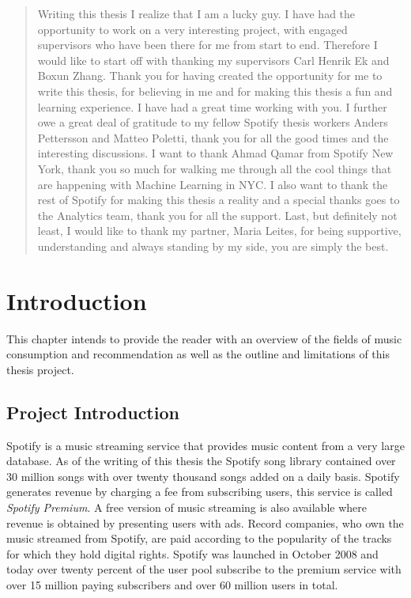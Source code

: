 \documentclass[a4paper,11pt]{kth-mag}
\begin{document}
\clearpage
\renewcommand{\abstractname}{Acknowledgements}
\begin{abstract}
 Writing this thesis I realize that I am a lucky guy. I have had the opportunity to work on a very interesting project, with engaged supervisors who have been there for me from start to end. Therefore I would like to start off with thanking my supervisors Carl Henrik Ek and Boxun Zhang. Thank you for having created the opportunity for me to write this thesis, for believing in me and for making this thesis a fun and learning experience. I have had a great time working with you. I further owe a great deal of gratitude to my fellow Spotify thesis workers Anders Pettersson and Matteo Poletti, thank you for all the good times and the interesting discussions. I want to thank Ahmad Qamar from Spotify New York, thank you so much for walking me through all the cool things that are happening with Machine Learning in NYC. I also want to thank the rest of Spotify for making this thesis a reality and a special thanks goes to the Analytics team, thank you for all the support.  Last, but definitely not least, I would like to thank my partner, Maria Leites, for being supportive, understanding and always standing by my side, you are simply the best.
\end{abstract}
  

\clearpage
\tableofcontents*
\mainmatter
\pagestyle{newchap}
\chapter{Introduction}
This chapter intends  to provide the reader with an overview of the fields of music consumption and recommendation as well as the outline and limitations of this thesis project.

\section{Project Introduction}
Spotify is a music streaming service that provides music content from a very large database. As of the writing of this thesis the Spotify song library contained over 30 million songs with over twenty thousand songs added on a daily basis\cite{spotifyPress}. Spotify generates revenue by charging a fee from subscribing users, this service is called \textit{Spotify Premium}. A free version of music streaming is also available where revenue is obtained by presenting users with ads. Record companies, who own the music streamed from Spotify, are paid according to the popularity of the tracks for which they hold digital rights. Spotify was launched in October 2008 and today over twenty percent of the user pool subscribe to the premium service with over 15 million paying subscribers and over 60 million users in total\cite{spotifyPress}.
\end{document}
